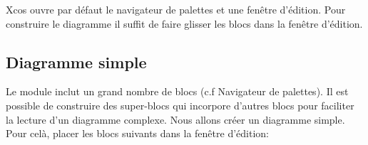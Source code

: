 Xcos ouvre par défaut le navigateur de palettes et une fenêtre d'édition. 
Pour construire le diagramme il suffit de faire glisser les blocs dans la fenêtre d'édition.

\subsection{Diagramme simple}

Le module inclut un grand nombre de blocs (c.f Navigateur de palettes).
Il est possible de construire des super-blocs qui incorpore d'autres blocs pour faciliter la lecture d'un
diagramme complexe. \newline
Nous allons créer un diagramme simple. Pour celà, placer les blocs suivants dans la fenêtre d'édition:

